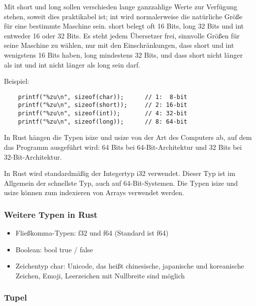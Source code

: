 Mit \glqq short\grqq{} und \glqq long\grqq{} sollen verschieden lange ganzzahlige Werte zur Ver\-fü\-gung stehen, soweit dies praktikabel ist; \glqq int\grqq{} wird normalerweise die natürliche Größe für eine bestimmte Maschine sein. \glqq short\grqq{} belegt oft 16 Bits, \glqq long\grqq{} 32 Bits und \glqq int\grqq{} entweder 16 oder 32 Bits. Es steht jedem Übersetzer frei, sinnvolle Größen für seine Maschine zu wählen, nur mit den Einschränkungen, dass \glqq short\grqq{} und \glqq int\grqq{} wenigstens 16 Bits haben, \glqq long\grqq{} mindestens 32 Bits, und dass \glqq short\grqq{} nicht länger als \glqq int\grqq{} und \glqq int\grqq{} nicht länger als \glqq long\grqq{} sein darf.

Beispiel:

\begin{lstlisting}
    printf("%zu\n", sizeof(char));      // 1:  8-bit
    printf("%zu\n", sizeof(short));     // 2: 16-bit
    printf("%zu\n", sizeof(int));       // 4: 32-bit
    printf("%zu\n", sizeof(long));      // 8: 64-bit
\end{lstlisting}

In Rust hängen die Typen \glqq isize\grqq{} und \glqq usize\grqq{} von der Art des Computers ab, auf dem das Programm ausgeführt wird: 64 Bits bei 64-Bit-Architektur und 32 Bits bei 32-Bit-Architektur.

In Rust wird standardmäßig der Integertyp i32 verwendet. Dieser Typ ist im Allgemein der schnellste Typ, auch auf 64-Bit-Systemen. Die Typen \glqq isize\grqq{} und \glqq usize\grqq{} können zum indexieren von Arrays verwendet werden.

\subsubsection{Weitere Typen in Rust}

\begin{itemize}
    \item Fließkomma-Typen: \glqq f32\grqq{} und \glqq f64\grqq{} (Standard ist \glqq f64\grqq{})
    \item Boolean: \glqq bool\grqq{} true / false
    \item Zeichentyp \glqq char\grqq{}: Unicode, das heißt chinesische, japanische und koreanische Zeichen, Emoji, Leerzeichen mit Nullbreite sind möglich
\end{itemize}

\subsubsection{Tupel}

